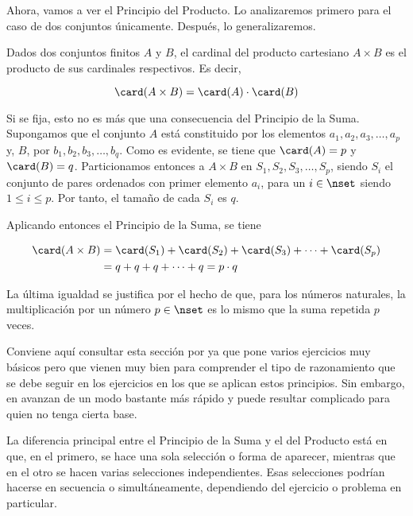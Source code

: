 Ahora, vamos a ver el Principio del Producto. Lo analizaremos primero para
el caso de dos conjuntos únicamente. Después, lo generalizaremos.

\begin{theorem}
  Dados dos conjuntos finitos $A$ y $B$, el cardinal del producto cartesiano
  $A \times B$ es el producto de sus cardinales respectivos. Es decir,

  $$ \card(A \times B) = \card(A) \cdot \card(B) $$
\end{theorem}

Si se fija, esto no es más que una consecuencia del Principio de la Suma.
Supongamos que el conjunto $A$ está constituido por los elementos $a_1, a_2,
a_3, \ldots, a_p$ y, $B$, por $b_1, b_2, b_3, \ldots, b_q$. Como es
evidente, se tiene que $\card(A) = p$ y $\card(B) = q$. Particionamos
entonces a $A \times B$ en $S_1, S_2, S_3, \ldots, S_p$, siendo $S_i$ el
conjunto de pares ordenados con primer elemento $a_i$, para un $i \in \nset$
siendo $1 \leq i \leq p$. Por tanto, el tamaño de cada $S_i$ es $q$.

Aplicando entonces el Principio de la Suma, se tiene

\begin{alignat*}{2}
  \card(A \times B)
    &= \card(S_1) + \card(S_2) + \card(S_3) + \cdots + \card(S_p) \\
    &= q + q + q + \cdots + q = p \cdot q
\end{alignat*}

\noindent La última igualdad se justifica por el hecho de que, para los
números naturales, la multiplicación por un número $p \in \nset$ es lo mismo
que la suma repetida $p$ veces.

Conviene aquí consultar esta sección por \cite{brualdi} ya que pone varios
ejercicios muy básicos pero que vienen muy bien para comprender el tipo de
razonamiento que se debe seguir en los ejercicios en los que se aplican
estos principios. Sin embargo, en \cite{bujalance-costa} avanzan de un modo
bastante más rápido y puede resultar complicado para quien no tenga cierta
base.

La diferencia principal entre el Principio de la Suma y el del Producto está
en que, en el primero, se hace una sola selección o forma de aparecer,
mientras que en el otro se hacen varias selecciones independientes. Esas
selecciones podrían hacerse en secuencia o simultáneamente, dependiendo del
ejercicio o problema en particular.

